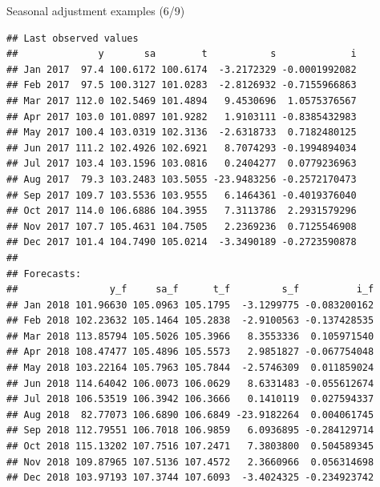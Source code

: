 \documentclass[10pt,xcolor=table,color={dvipsnames,usenames},ignorenonframetext,usepdftitle=false,french]{beamer}
\newenvironment{Shaded}{\begin{snugshade}}{\end{snugshade}}
\newcommand{\NormalTok}[1]{#1}
\newcommand{\OperatorTok}[1]{\textcolor[rgb]{0.81,0.36,0.00}{\textbf{#1}}}
\begin{document}
\begin{frame}[fragile]{Seasonal adjustment examples (6/9)}
\protect\hypertarget{seasonal-adjustment-examples-69}{}

\footnotesize

\begin{Shaded}
\end{Shaded}

\begin{verbatim}
## Last observed values
##              y       sa        t           s             i
## Jan 2017  97.4 100.6172 100.6174  -3.2172329 -0.0001992082
## Feb 2017  97.5 100.3127 101.0283  -2.8126932 -0.7155966863
## Mar 2017 112.0 102.5469 101.4894   9.4530696  1.0575376567
## Apr 2017 103.0 101.0897 101.9282   1.9103111 -0.8385432983
## May 2017 100.4 103.0319 102.3136  -2.6318733  0.7182480125
## Jun 2017 111.2 102.4926 102.6921   8.7074293 -0.1994894034
## Jul 2017 103.4 103.1596 103.0816   0.2404277  0.0779236963
## Aug 2017  79.3 103.2483 103.5055 -23.9483256 -0.2572170473
## Sep 2017 109.7 103.5536 103.9555   6.1464361 -0.4019376040
## Oct 2017 114.0 106.6886 104.3955   7.3113786  2.2931579296
## Nov 2017 107.7 105.4631 104.7505   2.2369236  0.7125546908
## Dec 2017 101.4 104.7490 105.0214  -3.3490189 -0.2723590878
## 
## Forecasts:
##                y_f     sa_f      t_f         s_f          i_f
## Jan 2018 101.96630 105.0963 105.1795  -3.1299775 -0.083200162
## Feb 2018 102.23632 105.1464 105.2838  -2.9100563 -0.137428535
## Mar 2018 113.85794 105.5026 105.3966   8.3553336  0.105971540
## Apr 2018 108.47477 105.4896 105.5573   2.9851827 -0.067754048
## May 2018 103.22164 105.7963 105.7844  -2.5746309  0.011859024
## Jun 2018 114.64042 106.0073 106.0629   8.6331483 -0.055612674
## Jul 2018 106.53519 106.3942 106.3666   0.1410119  0.027594337
## Aug 2018  82.77073 106.6890 106.6849 -23.9182264  0.004061745
## Sep 2018 112.79551 106.7018 106.9859   6.0936895 -0.284129714
## Oct 2018 115.13202 107.7516 107.2471   7.3803800  0.504589345
## Nov 2018 109.87965 107.5136 107.4572   2.3660966  0.056314698
## Dec 2018 103.97193 107.3744 107.6093  -3.4024325 -0.234923742
\end{verbatim}

\end{frame}
\end{document}
